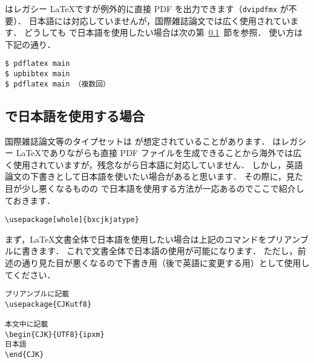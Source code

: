 \pLaTeX はレガシー \LaTeX ですが例外的に直接 PDF を出力できます（\verb|dvipdfmx| が不要）．
日本語には対応していませんが，国際雑誌論文では広く使用されています．
どうしても \pdfLaTeX で日本語を使用したい場合は次の第~\ref{ssec:pdflatex_jp}~節を参照．
使い方は下記の通り．

\begin{tcolorbox}[title={\pdfLaTeX$+$\upBibTeX}]
\begin{verbatim}
$ pdflatex main
$ upbibtex main
$ pdflatex main （複数回）
\end{verbatim}
\end{tcolorbox}


\subsection{\pdfLaTeX で日本語を使用する場合}
\label{ssec:pdflatex_jp}

国際雑誌論文等のタイプセットは \pdfLaTeX が想定されていることがあります．
\pdfLaTeX はレガシー \LaTeX でありながらも直接 PDF ファイルを生成できることから海外では広く使用されていますが，残念ながら日本語に対応していません．
しかし，英語論文の下書きとして日本語を使いたい場合があると思います．
その際に，見た目が少し悪くなるものの \pdfLaTeX で日本語を使用する方法が一応あるのでここで紹介しておきます．

\begin{tcolorbox}[title={文書全体で日本語を使用}]
\begin{verbatim}
\usepackage[whole]{bxcjkjatype}
\end{verbatim}
\end{tcolorbox}

まず，\LaTeX 文書全体で日本語を使用したい場合は上記のコマンドをプリアンブルに書きます．
これで文書全体で日本語の使用が可能になります．
ただし，前述の通り見た目が悪くなるので下書き用（後で英語に変更する用）として使用してください．

\begin{tcolorbox}[title={文書の一部分で日本語を使用}]
\begin{verbatim}
プリアンブルに記載
\usepackage{CJKutf8}

本文中に記載
\begin{CJK}{UTF8}{ipxm}
日本語
\end{CJK}
\end{verbatim}
\end{tcolorbox}

